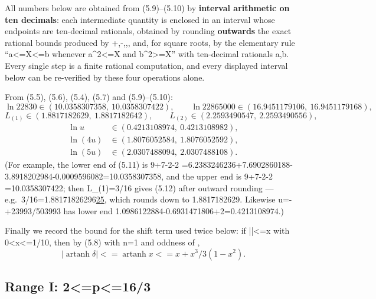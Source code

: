 \documentclass[10pt,reqno]{amsart}
\def\({}\def\){}%
\def\frac#1#2{#1/#2}%
\def\ge{>=}\def\le{<=}%
\theoremstyle{definition}
\theoremstyle{remark}
\begin{document}
All numbers below are obtained from (5.9)--(5.10) by \textbf{interval arithmetic on ten decimals}: each intermediate quantity is enclosed in an interval whose endpoints are ten-decimal rationals, obtained by rounding \textbf{outwards} the exact rational bounds produced by \(+,-,\times,\div\), and, for square roots, by the elementary rule ``\(a\le\sqrt X\le b\) whenever \(a^2\le X\) and \(b^2\ge X\)'' with ten-decimal rationals \(a,b\). Every single step is a finite rational computation, and every displayed interval below can be re-verified by these four operations alone.

From (5.5), (5.6), (5.4), (5.7) and (5.9)--(5.10): \[\ln22830\in(10.0358307358,\ 10.0358307422),\qquad
\ln22865000\in(16.9451179106,\ 16.9451179168), \tag{5.11}\] \[L_{(1)}\in(1.8817182629,\ 1.8817182642),\qquad
L_{(2)}\in(2.2593490547,\ 2.2593490556), \tag{5.12}\] \[
\begin{aligned}
\ln u&\in(0.4213108974,\ 0.4213108982),\\
\ln(4u)&\in(1.8076052584,\ 1.8076052592),\\
\ln(5u)&\in(2.0307488094,\ 2.0307488108).
\end{aligned}\tag{5.13}
\] (For example, the lower end of (5.11) is \(9+7-2-2
=6.2383246236+7.6902860188-3.8918202984-0.0009596082=10.0358307358\), and the upper end is \(9+7-2-2
=10.0358307422\); then \(L_{(1)}=\frac3{16}\) gives (5.12) after outward rounding --- e.g.~\(\frac3{16}=1.88171826296\underline{25}\), which rounds down to \(1.8817182629\). Likewise \(\ln u=-+2\frac{3993}{503993}\) has lower end \(1.0986122884-0.6931471806+2=0.4213108974\).)

Finally we record the bound for the shift term used twice below: if \(|\delta|\le x\) with \(0<x\le\frac1{10}\), then by (5.8) with \(n=1\) and oddness of \(\), \[\big|\operatorname{artanh}\delta\big|\le\operatorname{artanh}x
\le x+\frac{x^3}{3(1-x^2)} . \tag{5.14}\]

\subsection{Range I: \(2\le p\le\frac{16}{3}\)}\label{subsec:range1}
\end{document}
